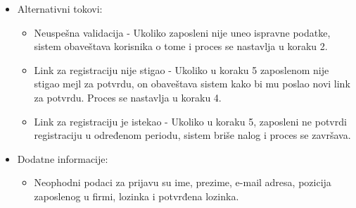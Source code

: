 \documentclass[a4paper]{article}
\begin{document}
\begin{itemize}
\begin{enumerate}
        \end{enumerate}
    \item Alternativni tokovi:
        \begin{itemize}
            \item Neuspešna validacija - Ukoliko zaposleni nije uneo ispravne podatke, sistem obaveštava korisnika o tome i proces se nastavlja u koraku 2.
            \item Link za registraciju nije stigao - Ukoliko u koraku 5 zaposlenom nije stigao mejl za potvrdu, on obaveštava sistem kako bi mu poslao novi link za potvrdu. Proces se nastavlja u koraku 4.
            \item Link za registraciju je istekao - Ukoliko u koraku 5, zaposleni ne potvrdi registraciju u određenom periodu, sistem briše nalog i proces se završava.
        \end{itemize}
    \item Dodatne informacije:
        \begin{itemize}
            \item Neophodni podaci za prijavu su ime, prezime, e-mail adresa, pozicija zaposlenog u firmi, lozinka i potvrđena lozinka.
        \end{itemize}
\end{itemize}
\end{document}
